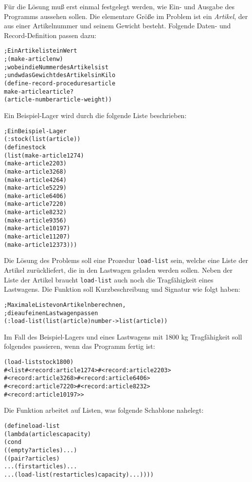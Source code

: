 Für die Lösung muß erst einmal festgelegt werden, wie Ein- und Ausgabe
des Programms aussehen sollen.  Die elementare Größe im Problem ist
ein \textit{Artikel}, der aus einer Artikelnummer und seinem Gewicht
besteht.  Folgende Daten- und Record-Definition passen dazu:
%
\begin{alltt}
; Ein Artikel ist ein Wert
;  (make-article n w)
; wobei n die Nummer des Artikels ist
; und w das Gewicht des Artikels in Kilo
(define-record-procedures article
  make-article article?
  (article-number article-weight))
\end{alltt}
%
Ein Beispiel-Lager wird durch die folgende
Liste beschrieben:
%
\begin{alltt}
; Ein Beispiel-Lager
(: stock (list(article))
(define stock
  (list (make-article 1 274)
        (make-article 2 203)
        (make-article 3 268)
        (make-article 4 264)
        (make-article 5 229)
        (make-article 6 406)
        (make-article 7 220)
        (make-article 8 232)
        (make-article 9 356)
        (make-article 10 197)
        (make-article 11 207)
        (make-article 12 373)))
\end{alltt}
%
Die Lösung des Problems soll eine Prozedur \texttt{load-list}
sein, welche eine Liste der Artikel zurückliefert, die in den Lastwagen geladen
werden sollen.  Neben der Liste der Artikel braucht
\texttt{load-list} auch noch die Tragfähigkeit eines Lastwagens.  Die
Funktion soll Kurzbeschreibung und Signatur wie folgt haben:
%
\begin{alltt}
; Maximale Liste von Artikeln berechnen, 
; die auf einen Lastwagen passen
(: load-list (list(article) number -> list(article))
\end{alltt}
%
Im Fall des Beispiel-Lagers und eines Lastwagens mit 1800 kg Tragfähigkeit
soll folgendes
passieren, wenn das Programm fertig ist:
%
\begin{alltt}
(load-list stock 1800)
\evalsto{} #<list #<record:article 1 274> #<record:article 2 203>
          #<record:article 3 268> #<record:article 6 406>
          #<record:article 7 220> #<record:article 8 232> 
          #<record:article 10 197>>
\end{alltt}
%
Die Funktion arbeitet auf Listen, was folgende Schablone nahelegt:
%
\begin{alltt}
(define load-list
  (lambda (articles capacity)
    (cond
     ((empty? articles) ...)
     ((pair? articles)
      ... (first articles) ...
      ... (load-list (rest articles) capacity) ...))))
\end{alltt}
